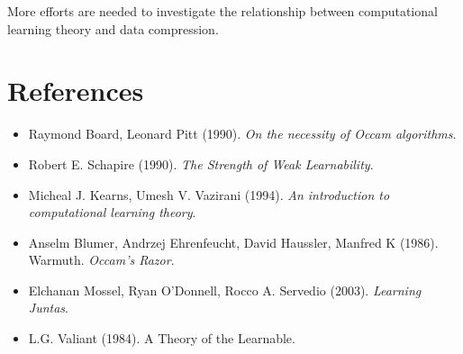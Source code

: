 \documentclass[12pt]{article}
\begin{document}
More efforts are needed to investigate the relationship between computational learning theory and data compression.

\section{References}

\begin{itemize}
\item Raymond Board, Leonard Pitt (1990). \emph {On the necessity of
    Occam algorithms}.
\item Robert E. Schapire (1990). \emph {The Strength of Weak
    Learnability}.
\item Micheal J. Kearns, Umesh V. Vazirani (1994). \emph {An introduction to
    computational learning theory}.
\item Anselm Blumer, Andrzej Ehrenfeucht, David Haussler, Manfred K (1986). Warmuth. \emph {Occam's Razor}.
\item Elchanan Mossel, Ryan O'Donnell, Rocco A. Servedio (2003). \emph
  {Learning Juntas}.
\item L.G. Valiant (1984). {A Theory of the Learnable}.
\end{itemize}
\end{document}
